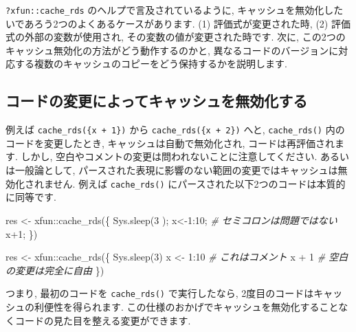 \documentclass[
  11pt,
  lualatex,
  ja=standard]{bxjsreport}
\newenvironment{Shaded}{\begin{snugshade}}{\end{snugshade}}
\newcommand{\CommentTok}[1]{\textcolor[rgb]{0.56,0.35,0.01}{\textit{#1}}}
\newcommand{\DecValTok}[1]{\textcolor[rgb]{0.00,0.00,0.81}{#1}}
\newcommand{\FunctionTok}[1]{\textcolor[rgb]{0.00,0.00,0.00}{#1}}
\newcommand{\NormalTok}[1]{#1}
\newcommand{\OtherTok}[1]{\textcolor[rgb]{0.56,0.35,0.01}{#1}}
\newcommand{\SpecialCharTok}[1]{\textcolor[rgb]{0.00,0.00,0.00}{#1}}
\begin{document}
\texttt{?xfun::cache\_rds} のヘルプで言及されているように, キャッシュを無効化したいであろう2つのよくあるケースがあります. (1) 評価式が変更された時, (2) 評価式の外部の変数が使用され, その変数の値が変更された時です. 次に, この2つのキャッシュ無効化の方法がどう動作するのかと, 異なるコードのバージョンに対応する複数のキャッシュのコピーをどう保持するかを説明します.

\hypertarget{ux30b3ux30fcux30c9ux306eux5909ux66f4ux306bux3088ux3063ux3066ux30adux30e3ux30c3ux30b7ux30e5ux3092ux7121ux52b9ux5316ux3059ux308b}{%
\subsection{コードの変更によってキャッシュを無効化する}\label{ux30b3ux30fcux30c9ux306eux5909ux66f4ux306bux3088ux3063ux3066ux30adux30e3ux30c3ux30b7ux30e5ux3092ux7121ux52b9ux5316ux3059ux308b}}

例えば \texttt{cache\_rds(\{x + 1\})} から \texttt{cache\_rds(\{x + 2\})} へと, \texttt{cache\_rds()} 内のコードを変更したとき, キャッシュは自動で無効化され, コードは再評価されます. しかし, 空白やコメントの変更は問われないことに注意してください. あるいは一般論として, パースされた表現に影響のない範囲の変更ではキャッシュは無効化されません. 例えば \texttt{cache\_rds()} にパースされた以下2つのコードは本質的に同等です.

\begin{Shaded}
\begin{Highlighting}[]
\NormalTok{res }\OtherTok{\textless{}{-}}\NormalTok{ xfun}\SpecialCharTok{::}\FunctionTok{cache\_rds}\NormalTok{(\{}
  \FunctionTok{Sys.sleep}\NormalTok{(}\DecValTok{3}\NormalTok{  );}
\NormalTok{  x}\OtherTok{\textless{}{-}}\DecValTok{1}\SpecialCharTok{:}\DecValTok{10}\NormalTok{;  }\CommentTok{\# セミコロンは問題ではない}
\NormalTok{  x}\SpecialCharTok{+}\DecValTok{1}\NormalTok{;}
\NormalTok{\})}

\NormalTok{res }\OtherTok{\textless{}{-}}\NormalTok{ xfun}\SpecialCharTok{::}\FunctionTok{cache\_rds}\NormalTok{(\{}
  \FunctionTok{Sys.sleep}\NormalTok{(}\DecValTok{3}\NormalTok{)}
\NormalTok{  x }\OtherTok{\textless{}{-}} \DecValTok{1}\SpecialCharTok{:}\DecValTok{10}  \CommentTok{\# これはコメント}
\NormalTok{  x }\SpecialCharTok{+}
    \DecValTok{1}  \CommentTok{\# 空白の変更は完全に自由}
\NormalTok{\})}
\end{Highlighting}
\end{Shaded}

つまり, 最初のコードを \texttt{cache\_rds()} で実行したなら, 2度目のコードはキャッシュの利便性を得られます. この仕様のおかげでキャッシュを無効化することなくコードの見た目を整える変更ができます.
\end{document}
